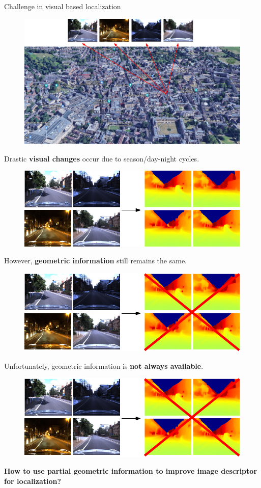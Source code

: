 \begin{frame}{Challenge in visual based localization}
	{
	\vfill
	\begin{figure}
		\includegraphics[width=0.8\linewidth]{vect/intro/fig4/1}
	\end{figure}
	\vfill	
	Drastic \textbf{visual changes} occur due to season/day-night cycles.
	}
	{
	\vfill
	\begin{figure}
		\centering
		\includegraphics[width=0.8\linewidth]{vect/intro/fig4/2}
	\end{figure}
	\vfill	
	However, \textbf{geometric information} still remains the same.
	}
	{
	\vfill
	\begin{figure}
		\centering
		\includegraphics[width=0.8\linewidth]{vect/intro/fig4/3}
	\end{figure}
	\vfill	
	Unfortunately, geometric information is \textbf{not always available}.
	}
	{
	\vfill
	\centering
	\begin{figure}
		\includegraphics[width=0.6\linewidth]{vect/intro/fig4/3}
	\end{figure}
	\vfill	
	\textbf{How to use partial geometric information to improve image descriptor for localization?}
	}
\end{frame}
